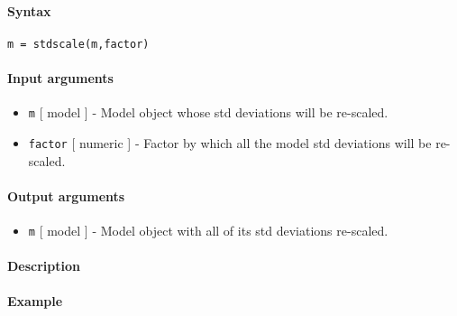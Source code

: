 


	\paragraph{Syntax}

\begin{verbatim}
m = stdscale(m,factor)
\end{verbatim}

\paragraph{Input arguments}

\begin{itemize}
\item
  \texttt{m} {[} model {]} - Model object whose std deviations will be
  re-scaled.
\item
  \texttt{factor} {[} numeric {]} - Factor by which all the model std
  deviations will be re-scaled.
\end{itemize}

\paragraph{Output arguments}

\begin{itemize}
\itemsep1pt\parskip0pt
\item
  \texttt{m} {[} model {]} - Model object with all of its std deviations
  re-scaled.
\end{itemize}

\paragraph{Description}

\paragraph{Example}


